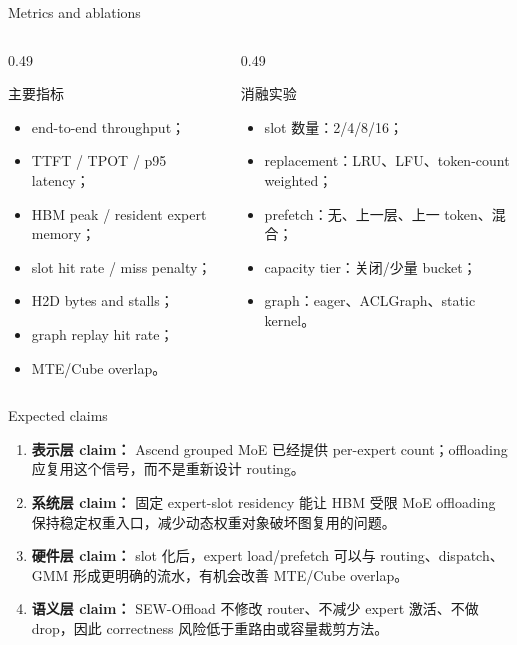 \documentclass[aspectratio=169,10pt]{beamer}
\begin{document}
\begin{frame}[t]{Metrics and ablations}
\small
\vspace{-0.35em}

\begin{columns}[T,onlytextwidth]
\begin{column}{0.49\textwidth}
\begin{block}{主要指标}
\footnotesize
\begin{itemize}
  \item end-to-end throughput；
  \item TTFT / TPOT / p95 latency；
  \item HBM peak / resident expert memory；
  \item slot hit rate / miss penalty；
  \item H2D bytes and stalls；
  \item graph replay hit rate；
  \item MTE/Cube overlap。
\end{itemize}
\end{block}
\end{column}

\begin{column}{0.49\textwidth}
\begin{block}{消融实验}
\footnotesize
\begin{itemize}
  \item slot 数量：2/4/8/16；
  \item replacement：LRU、LFU、token-count weighted；
  \item prefetch：无、上一层、上一 token、混合；
  \item capacity tier：关闭/少量 bucket；
  \item graph：eager、ACLGraph、static kernel。
\end{itemize}
\end{block}
\end{column}
\end{columns}
\end{frame}

\begin{frame}[t]{Expected claims}
\small
\vspace{-0.4em}

\begin{enumerate}
  \setlength\itemsep{0.85em}
  \item \textbf{表示层 claim：}
  Ascend grouped MoE 已经提供 per-expert count；offloading 应复用这个信号，而不是重新设计 routing。
  \item \textbf{系统层 claim：}
  固定 expert-slot residency 能让 HBM 受限 MoE offloading 保持稳定权重入口，减少动态权重对象破坏图复用的问题。
  \item \textbf{硬件层 claim：}
  slot 化后，expert load/prefetch 可以与 routing、dispatch、GMM 形成更明确的流水，有机会改善 MTE/Cube overlap。
  \item \textbf{语义层 claim：}
  SEW-Offload 不修改 router、不减少 expert 激活、不做 drop，因此 correctness 风险低于重路由或容量裁剪方法。
\end{enumerate}
\end{frame}
\end{document}
